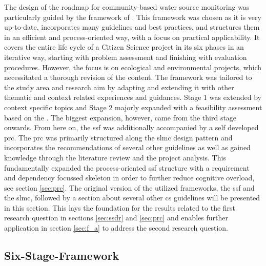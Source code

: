 The design of the roadmap for community-based water source monitoring was particularly guided by the framework of \textcite{fraislCitizenScienceEnvironmental2022}. This framework was chosen as it is very up-to-date, incorporates many guidelines and best practices, and structures them in an efficient and process-oriented way, with a focus on practical applicability. It covers the entire life cycle of a Citizen Science project in its six phases in an iterative way, starting with problem assessment and finishing with evaluation procedures. However, the focus is on ecological and environmental projects, which necessitated a thorough revision of the content.\newline
The framework was tailored to the study area and research aim by adapting and extending it with other thematic and context related experiences and guidances. Stage 1 was extended by context specific topics and Stage 2 majorly expanded with a feasibility assessment based on the \textcite{ifrcCommunityBasedSurveillanceGuiding2017}. The biggest expansion, however, came from the third stage onwards. From here on, the \acrshort{ssf} was additionally accompanied by a self developed \acrfull{prc}. The \acrshort{prc} was primarily structured along the \acrlong{slmc} design pattern and incorporates the recommendations of several other guidelines as well as gained knowledge through the literature review and the project analysis. This fundamentally expanded the process-oriented \acrshort{ssf} structure with a requirement and dependency focussed skeleton in order to further reduce cognitive overload, see section \ref{sec:prc}.\newline
The original version of the utilized frameworks, the \acrshort{ssf} and the \acrshort{slmc}, followed by a section about several other \acrshort{cs} guidelines will be presented in this section. This lays the foundation for the results related to the first research question in sections \ref{sec:ssdr} and \ref{sec:prc} and enables further application in section \ref{sec:f_a} to address the second research question.

\subsection{Six-Stage-Framework}\label{subsec:ssf}

